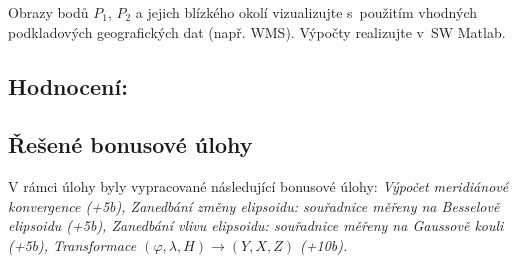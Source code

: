 \documentclass[12pt, a4paper]{article}
\begin{document}
\noindent Obrazy bodů $P_{1}$, $P_{2}$ a jejich blízkého okolí vizualizujte s~použitím vhodných podkladových geografických dat (např. WMS). Výpočty realizujte v~SW Matlab.

\vspace{10mm}
\subsection*{\textbf{Hodnocení:}}

\begin{center}
\end{center}
\vspace{15mm}

\subsection*{Řešené bonusové úlohy}
V rámci úlohy byly vypracované následující bonusové úlohy: \textit{Výpočet meridiánové konvergence (+5b), Zanedbání změny elipsoidu: souřadnice měřeny na Besselově elipsoidu (+5b), Zanedbání vlivu elipsoidu: souřadnice měřeny na Gaussově kouli (+5b), Transformace $(\varphi,\lambda,H)\rightarrow(Y,X,Z)$ (+10b).}
\end{document}
